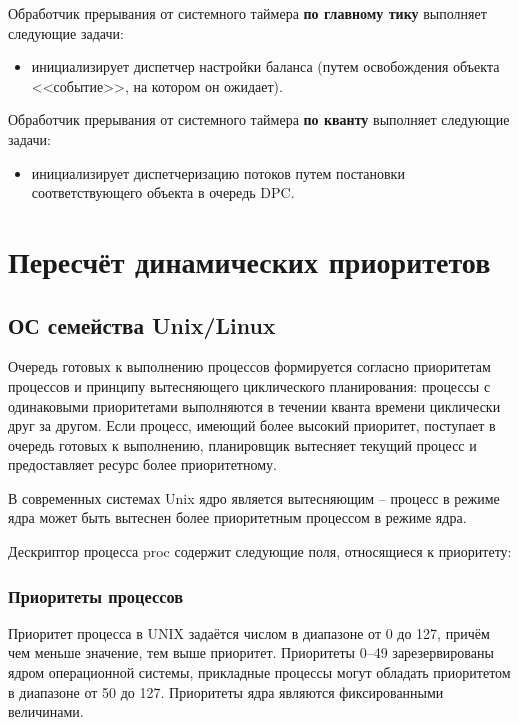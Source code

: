 Обработчик прерывания от системного таймера \textbf{по главному тику} выполняет следующие задачи:
\begin{itemize}
	\item инициализирует диспетчер настройки баланса (путем освобождения объекта <<событие>>, на котором он ожидает).
\end{itemize}

Обработчик прерывания от системного таймера \textbf{по кванту} выполняет следующие задачи:
\begin{itemize}
	\item инициализирует диспетчеризацию потоков путем постановки соответствующего объекта в очередь {\ttfamily DPC}.
\end{itemize}

\chapter{Пересчёт динамических приоритетов}

\section{ОС семейства Unix/Linux}

Очередь готовых к выполнению процессов формируется согласно приоритетам процессов и принципу вытесняющего циклического планирования: процессы с одинаковыми приоритетами выполняются в течении кванта времени циклически друг за другом. Если процесс, имеющий более высокий приоритет, поступает в очередь готовых к выполнению, планировщик вытесняет текущий процесс и предоставляет ресурс более приоритетному. 

В современных системах {\ttfamily Unix} ядро является вытесняющим – процесс в режиме ядра может быть вытеснен более приоритетным процессом в режиме ядра.

 

Дескриптор процесса proc содержит следующие поля, относящиеся к приоритету:

\subsection{Приоритеты процессов}

Приоритет процесса в {\ttfamily UNIX} задаётся числом в диапазоне от 0 до 127, причём чем меньше значение, тем выше приоритет. Приоритеты 0--49 зарезервированы ядром операционной системы, прикладные процессы могут обладать приоритетом в диапазоне от 50 до 127. Приоритеты ядра являются фиксированными величинами.

